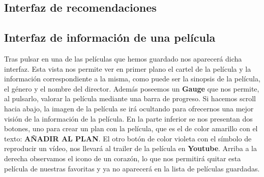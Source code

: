 \subsection{Interfaz de recomendaciones}
\label{makereference3.4.7}

\subsection{Interfaz de información de una película}
\label{makereference3.4.8}

Tras pulsar en una de las películas que hemos guardado nos aparecerá dicha interfaz. 
Esta vista nos permite ver en primer plano el cartel de la película y la información correspondiente a la misma, como puede
ser la sinopsis de la película, el género y el nombre del director. Además poseemos un \textbf{Gauge} que nos permite, al pulsarlo,
valorar la película mediante una barra de progreso.
Si hacemos scroll hacia abajo, la imagen de la película se irá ocultando para ofrecernos una mejor visión de la información de la película.
En la parte inferior se nos presentan dos botones, uno para crear un plan con la película, que es el de color amarillo con el texto: \textbf{AÑADIR AL PLAN}. El otro botón de color
violeta con el símbolo de reproducir un vídeo, nos llevará al trailer de la película en \textbf{Youtube}.
Arriba a la derecha observamos el icono de un corazón, lo que nos permitirá quitar esta película de nuestras favoritas y ya no aparecerá en la
lista de películas guardadas.

